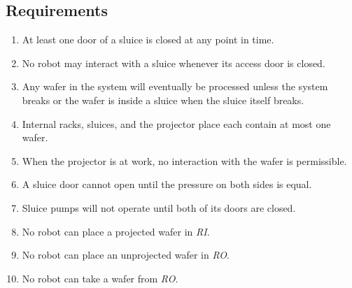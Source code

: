 \subsection{Requirements}
\begin{enumerate}
  \item At least one door of a sluice is closed at any point in time.
  \item No robot may interact with a sluice whenever its access door is closed.
  \item Any wafer in the system will eventually be processed unless the system breaks or the wafer is inside a sluice when the sluice itself breaks.
  \item Internal racks, sluices, and the projector place each contain at most one wafer.
  \item When the projector is at work, no interaction with the wafer is permissible.
  \item A sluice door cannot open until the pressure on both sides is equal.
  \item Sluice pumps will not operate until both of its doors are closed.
  \item No robot can place a projected wafer in \textit{RI}.
  \item No robot can place an unprojected wafer in \textit{RO}.
  \item No robot can take a wafer from \textit{RO}.
\end{enumerate}